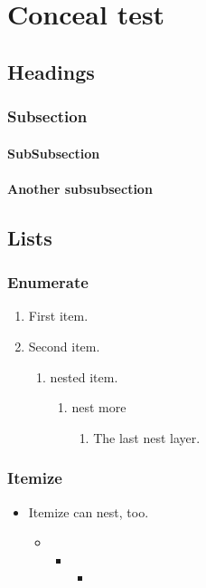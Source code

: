 \documentclass{ctexbook}
\begin{document}
\chapter{Conceal test}
\section{Headings}
\subsection{Subsection}
\subsubsection{SubSubsection}
\subsubsection{Another subsubsection}
\section{Lists}
\subsection{Enumerate}
\begin{enumerate}
  \item First item.
  \item Second item.
    \begin{enumerate}
      \item nested item.
        \begin{enumerate}
          \item nest more
            \begin{enumerate}
              \item The last nest layer.
            \end{enumerate}
        \end{enumerate}
    \end{enumerate}
\end{enumerate}
\subsection{Itemize}
\begin{itemize}
  \item Itemize can nest, too.
    \begin{itemize}
      \item
        \begin{itemize}
          \item
            \begin{itemize}
              \item
            \end{itemize}
        \end{itemize}
    \end{itemize}
\end{itemize}
\end{document}
